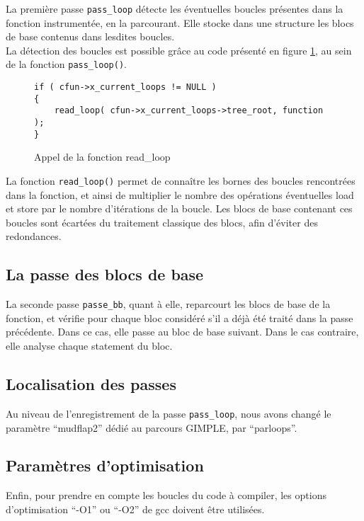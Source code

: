 La première passe \verb#pass_loop# détecte les éventuelles boucles présentes dans la fonction instrumentée, en la parcourant. Elle stocke dans une structure les blocs de base contenus dans lesdites boucles.\\

La détection des boucles est possible grâce au code présenté en figure \ref{fig:pass_loop}, au sein de la fonction \verb#pass_loop()#.\\

\begin{figure}[here]
  \centering
\begin{verbatim}
if ( cfun->x_current_loops != NULL )
{
    read_loop( cfun->x_current_loops->tree_root, function );
}
\end{verbatim}
  \caption{Appel de la fonction read\_loop}
  \label{fig:pass_loop}
\end{figure}

La fonction \verb#read_loop()# permet de connaître les bornes des boucles rencontrées dans la fonction, et ainsi de multiplier le nombre des opérations éventuelles load et store par le nombre d'itérations de la boucle. Les blocs de base contenant ces boucles sont écartées du traitement classique des blocs, afin d'éviter des redondances.

\subsection{La passe des blocs de base}

La seconde passe \verb#passe_bb#, quant à elle, reparcourt les blocs de base de la fonction, et vérifie pour chaque bloc considéré s'il a déjà été traité dans la passe précédente. Dans ce cas, elle passe au bloc de base suivant. Dans le cas contraire, elle analyse chaque statement du bloc.

\subsection{Localisation des passes}

Au niveau de l'enregistrement de la passe \verb#pass_loop#, nous avons changé le paramètre ``mudflap2'' dédié au parcours GIMPLE, par ``parloops''.

\subsection{Paramètres d'optimisation}

Enfin, pour prendre en compte les boucles du code à compiler, les options d'optimisation ``-O1'' ou ``-O2'' de gcc doivent être utilisées.
